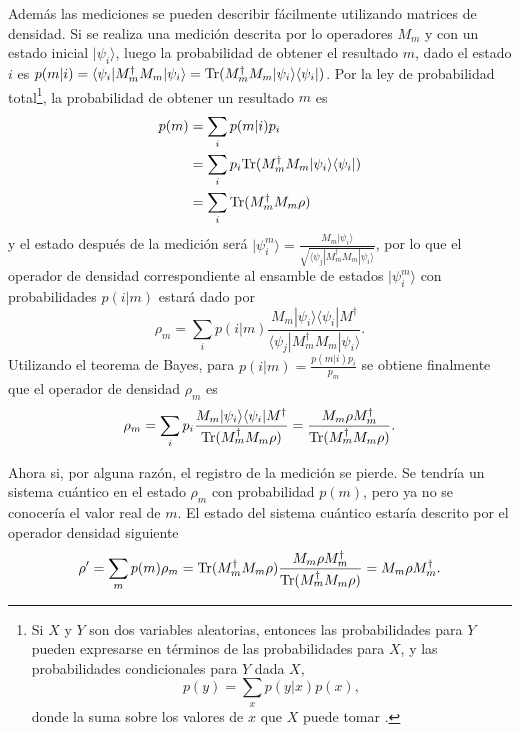 Además las mediciones se pueden describir fácilmente utilizando matrices de densidad. Si se realiza una medición descrita por lo operadores $M_m$ y con un estado inicial $|\psi_i\rangle$, luego la probabilidad de obtener el resultado $m$, dado el estado $i$ es $p(m|i)=\langle \psi_i|M_m^{\dagger}M_m|\psi_i\rangle = {\rm Tr}(M_m^{\dagger} M_m |\psi_i\rangle \langle\psi_i|)$. Por la ley de probabilidad total\footnote{Si  $X$ y $Y$ son dos variables aleatorias, entonces las probabilidades para $Y $ pueden expresarse en términos de las probabilidades para $X$, y las probabilidades condicionales para $ Y$ dada $X$,
\[p(y) =\sum_x p(y|x)p(x),\] 
donde la suma sobre los valores de
$x$ que $X$ puede tomar {\cite{nielsen_chuang_2010}}.}, la probabilidad de
obtener un resultado $m$ es {\cite{nielsen_chuang_2010}}
\begin{equation}
	\label{probabilidad_m}
	\begin{split}
	p(m) &= \sum_{i}p(m|i)p_i\\
	&=\sum_i p_i{\rm Tr}(M_m^{\dagger} M_m |\psi_i\rangle \langle\psi_i|)\\
	&=\sum_{i}{\rm Tr}(M_m^{\dagger} M_m \rho)
	\end{split}
\end{equation} y el estado después de la medición será $|\psi_i^m\rangle=\frac{M_m|\psi_i\rangle}{\sqrt{\langle\psi_j|M_m^{\dagger}M_m|\psi_i\rangle}}$, por lo que el operador de densidad correspondiente al ensamble de estados $|\psi_i^m\rangle$ con probabilidades $p(i|m)$ estará dado por \[\rho_m=\sum_i p(i|m)\frac{M_m|\psi_i\rangle \langle \psi_i|M^{\dagger}}{\langle\psi_j|M_m^{\dagger}M_m|\psi_i\rangle}.\] Utilizando el teorema de Bayes, para $p(i|m)=\frac{p(m|i)p_i}{p_m}$ se obtiene finalmente que el operador de densidad $\rho_m$ es{\cite{nielsen_chuang_2010}} \begin{equation}
	\rho_m=\sum_i p_i \dfrac{M_m|\psi_i\rangle \langle \psi_i|M^{\dagger}}{{\rm Tr}(M^{\dagger}_m M_m \rho )}=\dfrac{M_m \rho M_m^{\dagger}}{{\rm Tr} (M^{\dagger}_m M_m\rho )}.
\end{equation}


Ahora si, por alguna razón, el registro de la medición se pierde. Se tendría un sistema cuántico en el estado $\rho_m$ con probabilidad $p(m)$, pero ya no se conocería el valor real de $m$. El estado del sistema cuántico estaría descrito por el operador densidad siguiente \begin{equation}
	\rho'=\sum_m p(m)\rho_m={\rm Tr}(M^{\dagger}_m M_m\rho )\dfrac{M_m\rho M_m^{\dagger}}{{\rm Tr} (M^{\dagger}_m M_m \rho )}=M_m\rho M_m^{\dagger}.
\end{equation}


